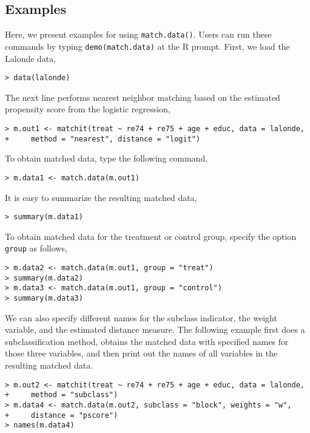 \subsection{Examples}

Here, we present examples for using {\tt match.data()}. Users can run
these commands by typing {\tt demo(match.data)} at the R
prompt. First, we load the Lalonde data,

\begin{verbatim}
> data(lalonde)
\end{verbatim}

The next line performs nearest neighbor matching based on the
estimated propensity score from the logistic regression,

\begin{verbatim}
> m.out1 <- matchit(treat ~ re74 + re75 + age + educ, data = lalonde, 
+     method = "nearest", distance = "logit")
\end{verbatim}

To obtain matched data, type the following command, 

\begin{verbatim}
> m.data1 <- match.data(m.out1)
\end{verbatim}

It is easy to summarize the resulting matched data,

\begin{verbatim}
> summary(m.data1)
\end{verbatim}

To obtain matched data for the treatment or control group, specify the option
{\tt group} as follows,

\begin{verbatim}
> m.data2 <- match.data(m.out1, group = "treat")
> summary(m.data2)
> m.data3 <- match.data(m.out1, group = "control")
> summary(m.data3)
\end{verbatim}

We can also specify different names for the subclass indicator, the
weight variable, and the estimated distance measure. The following
example first does a subclassification method, obtains the
matched data with specified names for those three variables, and then
print out the names of all variables in the resulting matched data.

\begin{verbatim}
> m.out2 <- matchit(treat ~ re74 + re75 + age + educ, data = lalonde, 
+     method = "subclass")
> m.data4 <- match.data(m.out2, subclass = "block", weights = "w", 
+     distance = "pscore")
> names(m.data4)
\end{verbatim}

